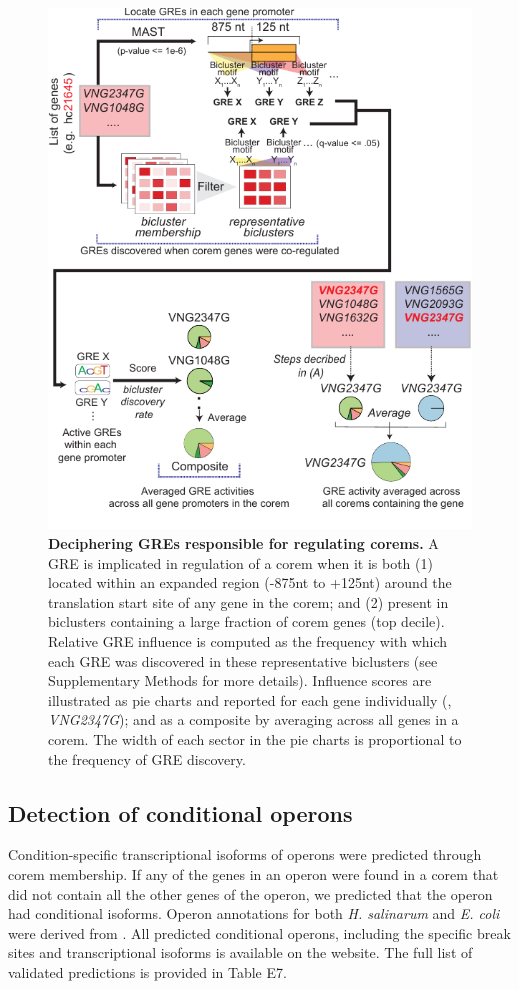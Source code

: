 \begin{figure}[hp]
\centering
\includegraphics[width=0.95\linewidth]{figures/corem_gres.pdf}
\caption[Deciphering GREs responsible for regulating corems]{\textbf{Deciphering GREs responsible for regulating corems.} A GRE is implicated in regulation of a corem when it is both (1) located within an expanded region (-875nt to +125nt) around the translation start site of any gene in the corem; and (2) present in biclusters containing a large fraction of corem genes (top decile). Relative GRE influence is computed as the frequency with which each GRE was discovered in these representative biclusters (see Supplementary Methods for more details). Influence scores are illustrated as pie charts and reported for each gene individually (\eg, \textit{VNG2347G}); and as a composite by averaging across all genes in a corem. The width of each sector in the pie charts is proportional to the frequency of GRE discovery.}
\label{fig:corem_gres}
\end{figure}

\subsection{Detection of conditional operons}
\label{section:condop}
Condition-specific transcriptional isoforms of operons were predicted
through corem membership. If any of the genes in an operon were found
in a corem that did not contain all the other genes of the operon, we
predicted that the operon had conditional isoforms. Operon annotations
for both {\it H. salinarum} and {\it E. coli} were derived from
 \cite{Alm2005,Price2005b}. All predicted conditional
operons, including the specific break sites and transcriptional
isoforms is available on the website. The full list of validated
predictions is provided in Table E7.

